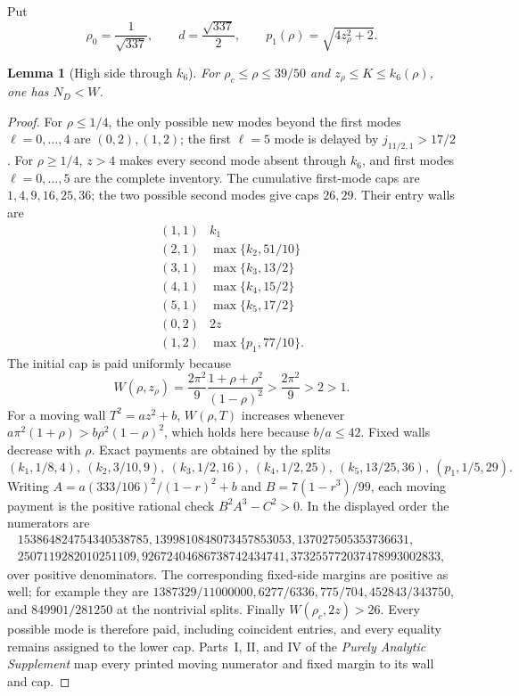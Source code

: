 \documentclass[11pt]{article}
\numberwithin{equation}{section}
\newtheorem{lemma}[theorem]{Lemma}
\theoremstyle{definition}
\theoremstyle{remark}
\begin{document}
Put
\[
 \rho_0=\frac1{\sqrt{337}},\qquad d=\frac{\sqrt{337}}2,
 \qquad p_1(\rho)=\sqrt{4z_\rho^2+2}.
\]

\begin{lemma}[High side through \(k_6\)]
\label{cm:lem-k6}
For \(\rho_c\leq\rho\leq39/50\) and
\(z_\rho\leq K\leq k_6(\rho)\), one has \(N_D<W\).
\end{lemma}

\begin{proof}
For \(\rho\leq1/4\), the only possible new modes beyond the first modes
\(\ell=0,\ldots,4\) are \((0,2),(1,2)\); the first \(\ell=5\) mode is
delayed by \(j_{11/2,1}>17/2\).  For \(\rho\geq1/4\),
\(z>4\) makes every second mode absent through \(k_6\), and first modes
\(\ell=0,\ldots,5\) are the complete inventory.  The cumulative first-mode
caps are \(1,4,9,16,25,36\); the two possible second modes give caps
\(26,29\).  Their entry walls are
\[
\begin{array}{c|c}
(1,1)&k_1\\
(2,1)&\max\{k_2,51/10\}\\
(3,1)&\max\{k_3,13/2\}\\
(4,1)&\max\{k_4,15/2\}\\
(5,1)&\max\{k_5,17/2\}\\
(0,2)&2z\\
(1,2)&\max\{p_1,77/10\}.
\end{array}
\]
The initial cap is paid uniformly because
\[
 W(\rho,z_\rho)=\frac{2\pi^2}{9}
 \frac{1+\rho+\rho^2}{(1-\rho)^2}
 >\frac{2\pi^2}{9}>2>1.
\]
For a moving wall \(T^2=az^2+b\), \(W(\rho,T)\) increases whenever
\(a\pi^2(1+\rho)>b\rho^2(1-\rho)^2\), which holds here because
\(b/a\leq42\).  Fixed walls decrease with \(\rho\).  Exact payments are
obtained by the splits
\[
 (k_1,1/8,4),\ (k_2,3/10,9),\ (k_3,1/2,16),\
 (k_4,1/2,25),\ (k_5,13/25,36),\ (p_1,1/5,29).
\]
Writing
\(A=a(333/106)^2/(1-r)^2+b\) and
\(B=7(1-r^3)/99\), each moving payment is the positive rational check
\(B^2A^3-C^2>0\).  In the displayed order the numerators are
\[
\begin{gathered}
153864824754340538785,
1399810848073457853053,
137027505353736631,\\
2507119282010251109,
92672404686738742434741,
373255772037478993002833,
\end{gathered}
\]
over positive denominators.  The corresponding fixed-side margins are
positive as well; for example they are
\(1387329/11000000,6277/6336,775/704,452843/343750\), and
\(849901/281250\) at the nontrivial splits.  Finally
\(W(\rho_c,2z)>26\).  Every possible mode is therefore paid, including
coincident entries, and every equality remains assigned to the lower cap.
 Parts~I, II, and IV of the \emph{Purely Analytic Supplement} map every
 printed moving numerator and fixed margin to its wall and cap.
\end{proof}
\end{document}
